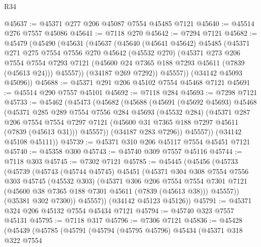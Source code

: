\begin{lexlean}{R34}
\begin{coremodule}
@45637 := @45371 @277 @206 @45087 @7554 @45485 @7121
@45640 := @45514 @276 @7557 @45086
@45641 := @7118 @270
@45642 := @7294 @7121
@45682 := @45479
    (@45490
      (@45631
        (@45637
          (@45640
            (@45641 @45642)
            @45485
            (@45371
              @271
              @275
              @7554
              @7556
              @270
              @45642
              (@45532 @270)
              (@45371
                @273
                @206
                @7554
                @7554
                @7293
                @7121
                (@45600 @24 @7365 @188 @7293 @45611 (@7839 (@45613 @24)))
                @45557))
            (@34187 @269 @7292))
          @45557))
      (@34142 @45093 @45096))
@45688 := @45371 @291 @206 @45102 @7554 @45468 @7121
@45691 := @45514 @290 @7557 @45101
@45692 := @7118 @284
@45693 := @7298 @7121
@45733 := @45462
    (@45473
      (@45682
        (@45688
          (@45691
            (@45692 @45693)
            @45468
            (@45371
              @285
              @289
              @7554
              @7556
              @284
              @45693
              (@45532 @284)
              (@45371
                @287
                @206
                @7554
                @7554
                @7297
                @7121
                (@45600 @31 @7365 @188 @7297 @45611 (@7839 (@45613 @31)))
                @45557))
            (@34187 @283 @7296))
          @45557))
      (@34142 @45108 @45111))
@45739 := @45371 @310 @206 @45117 @7554 @45451 @7121
@45740 := @45358 @300
@45743 := @45740 @309 @7557 @45116
@45744 := @7118 @303
@45745 := @7302 @7121
@45785 := @45445
    (@45456
      (@45733
        (@45739
          (@45743
            (@45744 @45745)
            @45451
            (@45371
              @304
              @308
              @7554
              @7556
              @303
              @45745
              (@45532 @303)
              (@45371
                @306
                @206
                @7554
                @7554
                @7301
                @7121
                (@45600 @38 @7365 @188 @7301 @45611 (@7839 (@45613 @38)))
                @45557))
            (@35381 @302 @7300))
          @45557))
      (@34142 @45123 @45126))
@45791 := @45371 @324 @206 @45132 @7554 @45434 @7121
@45794 := @45740 @323 @7557 @45131
@45795 := @7118 @317
@45796 := @7306 @7121
@45836 := @45428
    (@45439
      (@45785
        (@45791
          (@45794
            (@45795 @45796)
            @45434
            (@45371
              @318
              @322
              @7554

\end{coremodule}
\end{lexlean}
